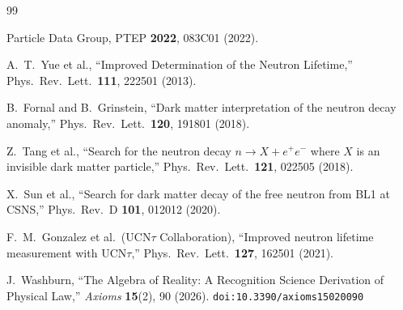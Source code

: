 \documentclass[12pt,a4paper]{article}
\theoremstyle{definition}
\theoremstyle{remark}
\begin{document}
\begin{thebibliography}{99}

Particle Data Group, PTEP \textbf{2022}, 083C01 (2022).

A.~T.~Yue et al.,
``Improved Determination of the Neutron Lifetime,''
Phys.\ Rev.\ Lett.\ \textbf{111}, 222501 (2013).

B.~Fornal and B.~Grinstein,
``Dark matter interpretation of the neutron decay anomaly,''
Phys.\ Rev.\ Lett.\ \textbf{120}, 191801 (2018).

Z.~Tang et al.,
``Search for the neutron decay $n \to X + e^+ e^-$ where $X$ is an
invisible dark matter particle,''
Phys.\ Rev.\ Lett.\ \textbf{121}, 022505 (2018).

X.~Sun et al.,
``Search for dark matter decay of the free neutron from BL1 at CSNS,''
Phys.\ Rev.\ D \textbf{101}, 012012 (2020).

F.~M.~Gonzalez et al.\ (UCN$\tau$ Collaboration),
``Improved neutron lifetime measurement with UCN$\tau$,''
Phys.\ Rev.\ Lett.\ \textbf{127}, 162501 (2021).

J.~Washburn, ``The Algebra of Reality: A Recognition Science Derivation
of Physical Law,'' \emph{Axioms} \textbf{15}(2), 90 (2026).
\texttt{doi:10.3390/axioms15020090}

\end{thebibliography}
\end{document}
